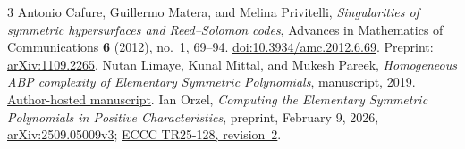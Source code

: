 \documentclass[11pt]{article}
\theoremstyle{remark}
\begin{document}
\begin{thebibliography}{3}
Antonio Cafure, Guillermo Matera, and Melina Privitelli,
\emph{Singularities of symmetric hypersurfaces and Reed--Solomon codes},
Advances in Mathematics of Communications \textbf{6} (2012), no.~1,
69--94. \href{https://doi.org/10.3934/amc.2012.6.69}{doi:10.3934/amc.2012.6.69}.
Preprint: \href{https://arxiv.org/abs/1109.2265}{arXiv:1109.2265}.
Nutan Limaye, Kunal Mittal, and Mukesh Pareek,
\emph{Homogeneous ABP complexity of Elementary Symmetric Polynomials},
manuscript, 2019.
\href{https://www.cse.iitb.ac.in/~nutan/papers/abp-complexity.pdf}{Author-hosted manuscript}.
Ian Orzel, \emph{Computing the Elementary Symmetric Polynomials in
Positive Characteristics}, preprint, February 9, 2026,
\href{https://arxiv.org/abs/2509.05009v3}{arXiv:2509.05009v3};
\href{https://eccc.weizmann.ac.il/report/2025/128/revision/2/download}{ECCC
TR25-128, revision~2}.
\end{thebibliography}
\end{document}
